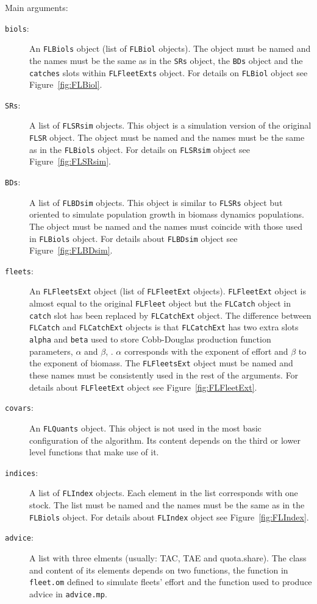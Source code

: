 \noindent Main arguments:
\begin{description}
	\item[\texttt{biols}:] An \texttt{FLBiols} object (list of \texttt{FLBiol} objects). The object must be named and the names must be the same as in the \texttt{SRs} object, the \texttt{BDs} object and the \texttt{catches} slots within \texttt{FLFleetExts} object. For details on \texttt{FLBiol} object see Figure~\ref{fig:FLBiol}. 
	\item[\texttt{SRs}:] A list of \texttt{FLSRsim} objects. This object is a simulation version of the original \texttt{FLSR} object. The object must be named and the names must be the same as in the \texttt{FLBiols} object. For details on \texttt{FLSRsim} object see Figure~\ref{fig:FLSRsim}.
	\item[\texttt{BDs}:] A list of \texttt{FLBDsim} objects. This object is similar to \texttt{FLSRs} object but oriented to simulate	population growth in biomass dynamics populations. The object must be named and the names must coincide with those used in \texttt{FLBiols} object. For details about \texttt{FLBDsim} object see Figure~\ref{fig:FLBDsim}.
	\item[\texttt{fleets}:] An \texttt{FLFleetsExt} object (list of \texttt{FLFleetExt} objects). \texttt{FLFleetExt} object is almost equal to the original \texttt{FLFleet} object but the \texttt{FLCatch} object in \texttt{catch} slot has been replaced by \texttt{FLCatchExt} object. The difference between  \texttt{FLCatch}  and \texttt{FLCatchExt} objects is that \texttt{FLCatchExt} has two extra slots \texttt{alpha} and \texttt{beta} used to store Cobb-Douglas production function parameters, $\alpha$ and $\beta$, \citep{Cobb1928, Clark1990}. $\alpha$ corresponds with the exponent of effort and $\beta$ to the exponent of biomass. The \texttt{FLFleetsExt} object must be named and these names must be consistently used in the rest of the arguments. For details about \texttt{FLFleetExt} object see Figure~\ref{fig:FLFleetExt}.
	\item[\texttt{covars}:] An \texttt{FLQuants} object. This object is not used in the most basic configuration of the algorithm. Its content depends on the third or lower level functions that make use of it.  
	\item[\texttt{indices}:] A list of \texttt{FLIndex} objects. Each element in the list corresponds with one stock. The list must be named and the names must be the same as in the \texttt{FLBiols} object. For details about \texttt{FLIndex} object see Figure~\ref{fig:FLIndex}.
	\item[\texttt{advice}:] A list with three elments (usually: TAC, TAE and quota.share). The class and content of its elements depends on two functions, the function in \texttt{fleet.om} defined to simulate fleets' effort and the function used to produce advice in \texttt{advice.mp}. 
\end{description}
   
